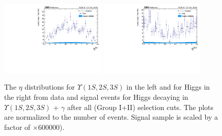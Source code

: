 \begin{figure}[!htbp]
\begin{center}
\includegraphics[width=0.45\textwidth]{figures_and_tables/outputPlots/HtoUpsilon_Cat0_ZZZZZ/nEvts/data_x_mc/withKinCuts/h_withKin_Upsilon_eta}\hspace*{1.cm}
\includegraphics[width=0.45\textwidth]{figures_and_tables/outputPlots/HtoUpsilon_Cat0_ZZZZZ/nEvts/data_x_mc/withKinCuts/h_withKin_Z_eta}
\end{center}\vspace*{-.5cm}
\caption{The $\eta$ distributions for $\Upsilon(1S,2S,3S)$ in the left and for Higgs in the right from data and signal events for Higgs decaying in $\Upsilon(1S,2S,3S)$ + $\gamma$ after all (Group I+II) selection cuts. The plots are normalized to the number of events. Signal sample is scaled by a factor of $\times 600000$).}
\label{fig:etaUpsilon_and_Higgs_HtoUpsilon_Cat0_groupI_plus_II}
\end{figure}

